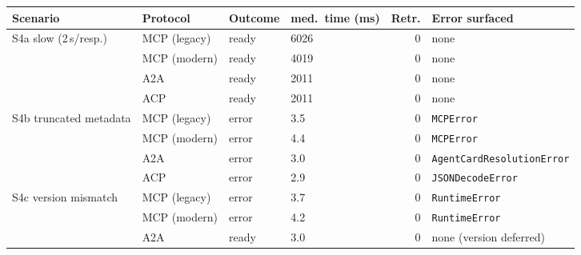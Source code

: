 \begin{tabular}{llllrl}
\toprule
Scenario & Protocol & Outcome & med.\ time (ms) & Retr. & Error surfaced \\
\midrule
S4a slow (2\,s/resp.) & MCP (legacy) & ready & 6026 & 0 & none \\
 & MCP (modern) & ready & 4019 & 0 & none \\
 & A2A & ready & 2011 & 0 & none \\
 & ACP & ready & 2011 & 0 & none \\
\addlinespace
S4b truncated metadata & MCP (legacy) & error & 3.5 & 0 & \texttt{MCPError} \\
 & MCP (modern) & error & 4.4 & 0 & \texttt{MCPError} \\
 & A2A & error & 3.0 & 0 & \texttt{AgentCardResolutionError} \\
 & ACP & error & 2.9 & 0 & \texttt{JSONDecodeError} \\
\addlinespace
S4c version mismatch & MCP (legacy) & error & 3.7 & 0 & \texttt{RuntimeError} \\
 & MCP (modern) & error & 4.2 & 0 & \texttt{RuntimeError} \\
 & A2A & ready & 3.0 & 0 & none (version deferred) \\
\bottomrule
\end{tabular}